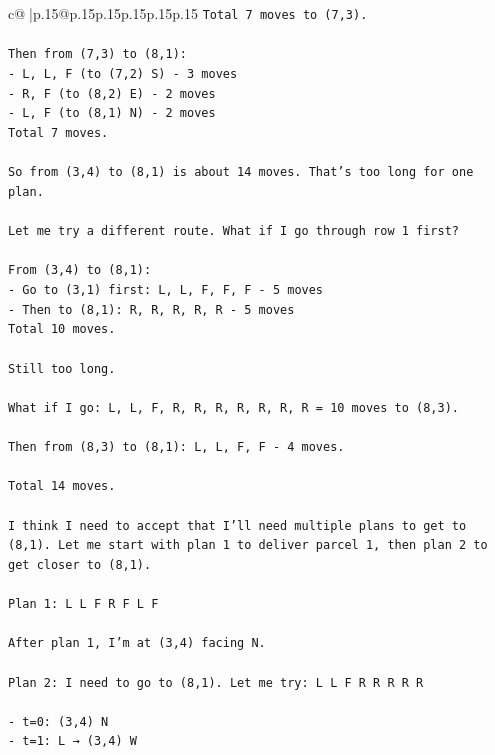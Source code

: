 \documentclass{article}
\begin{document}
{\begin{supertabular}{c@{$\;$}|p{.15\linewidth}@{}p{.15\linewidth}p{.15\linewidth}p{.15\linewidth}p{.15\linewidth}p{.15\linewidth}}
{{{\texttt{Total 7 moves to (7,3).} \\
\\ 
\texttt{Then from (7,3) to (8,1):} \\
\texttt{{-} L, L, F (to (7,2) S) {-} 3 moves} \\
\texttt{{-} R, F (to (8,2) E) {-} 2 moves} \\
\texttt{{-} L, F (to (8,1) N) {-} 2 moves} \\
\texttt{Total 7 moves.} \\
\\ 
\texttt{So from (3,4) to (8,1) is about 14 moves. That's too long for one plan.} \\
\\ 
\texttt{Let me try a different route. What if I go through row 1 first?} \\
\\ 
\texttt{From (3,4) to (8,1):} \\
\texttt{{-} Go to (3,1) first: L, L, F, F, F {-} 5 moves} \\
\texttt{{-} Then to (8,1): R, R, R, R, R {-} 5 moves} \\
\texttt{Total 10 moves.} \\
\\ 
\texttt{Still too long.} \\
\\ 
\texttt{What if I go: L, L, F, R, R, R, R, R, R, R = 10 moves to (8,3).} \\
\\ 
\texttt{Then from (8,3) to (8,1): L, L, F, F {-} 4 moves.} \\
\\ 
\texttt{Total 14 moves.} \\
\\ 
\texttt{I think I need to accept that I'll need multiple plans to get to (8,1). Let me start with plan 1 to deliver parcel 1, then plan 2 to get closer to (8,1).} \\
\\ 
\texttt{Plan 1: L L F R F L F} \\
\\ 
\texttt{After plan 1, I'm at (3,4) facing N.} \\
\\ 
\texttt{Plan 2: I need to go to (8,1). Let me try: L L F R R R R R} \\
\\ 
\texttt{{-} t=0: (3,4) N} \\
\texttt{{-} t=1: L → (3,4) W} \\
}}}
\end{supertabular}}
\end{document}
